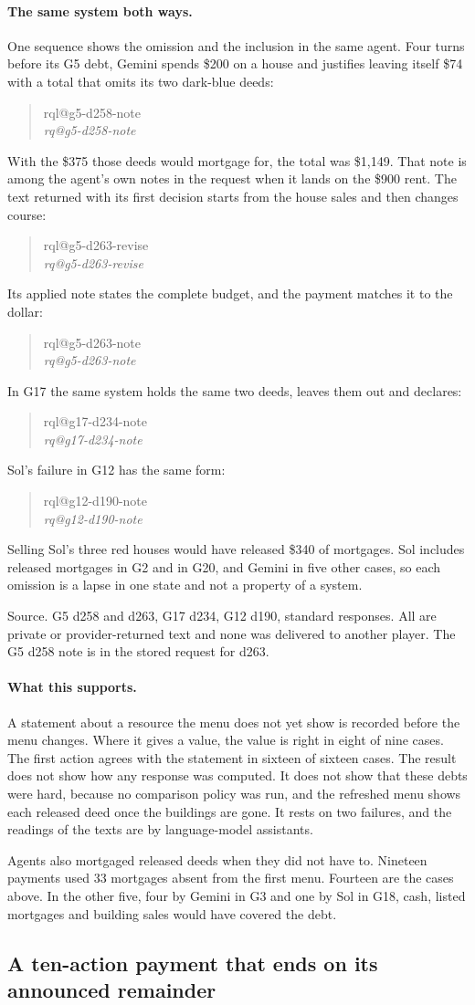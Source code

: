 \documentclass[11pt,letterpaper]{article}
\makeatletter
\newcommand{\QuoteCard}[1]{%
  \begin{quote}\small
  {\footnotesize\sffamily\color{black!65}\csname rql@#1\endcsname}\\[1pt]
  \itshape\csname rq@#1\endcsname
  \end{quote}}
\newcommand{\Source}[1]{\par{\footnotesize\sffamily\color{black!65}Source. #1\par}}
\makeatother
\begin{document}
\paragraph{The same system both ways.} One sequence shows the omission and the inclusion in the same agent. Four turns before its G5 debt, Gemini spends \$200 on a house and justifies leaving itself \$74 with a total that omits its two dark-blue deeds:
\QuoteCard{g5-d258-note}
With the \$375 those deeds would mortgage for, the total was \$1,149. That note is among the agent's own notes in the request when it lands on the \$900 rent. The text returned with its first decision starts from the house sales and then changes course:
\QuoteCard{g5-d263-revise}
Its applied note states the complete budget, and the payment matches it to the dollar:
\QuoteCard{g5-d263-note}
In G17 the same system holds the same two deeds, leaves them out and declares:
\QuoteCard{g17-d234-note}
Sol's failure in G12 has the same form:
\QuoteCard{g12-d190-note}
Selling Sol's three red houses would have released \$340 of mortgages. Sol includes released mortgages in G2 and in G20, and Gemini in five other cases, so each omission is a lapse in one state and not a property of a system.
\Source{G5 d258 and d263, G17 d234, G12 d190, standard responses. All are private or provider-returned text and none was delivered to another player. The G5 d258 note is in the stored request for d263.}

\paragraph{What this supports.} A statement about a resource the menu does not yet show is recorded before the menu changes. Where it gives a value, the value is right in eight of nine cases. The first action agrees with the statement in sixteen of sixteen cases. The result does not show how any response was computed. It does not show that these debts were hard, because no comparison policy was run, and the refreshed menu shows each released deed once the buildings are gone. It rests on two failures, and the readings of the texts are by language-model assistants.

Agents also mortgaged released deeds when they did not have to. Nineteen payments used 33 mortgages absent from the first menu. Fourteen are the cases above. In the other five, four by Gemini in G3 and one by Sol in G18, cash, listed mortgages and building sales would have covered the debt.

\subsection{A ten-action payment that ends on its announced remainder}
\end{document}
